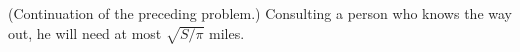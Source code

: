 (Continuation of the preceding problem.) Consulting a person who knows the way out, he will need at most $\sqrt{S/\pi}$ miles.
